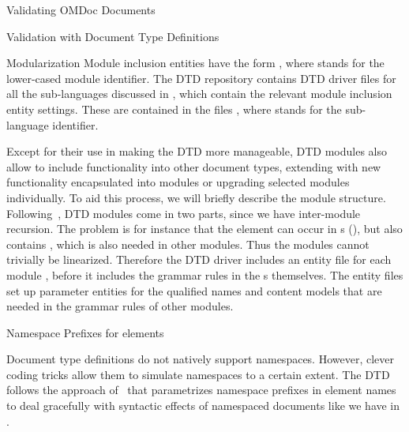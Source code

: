 \begin{tchapter}[id=validating]{Validating OMDoc Documents}
\begin{tsection}[id=validate-dtd]{Validation with Document Type Definitions}
\begin{tsubsection}[id=modularization]{Modularization}
Module inclusion entities have the form {}, where
{} stands for the lower-cased module identifier. The {\omdoc} DTD
repository contains DTD driver files for all the sub-languages discussed in
{}, which contain the relevant module inclusion entity
settings. These are contained in the files {}, where
{} stands for the sub-language identifier.

Except for their use in making the {\omdoc} DTD more manageable, DTD modules also allow to
include {\omdoc} functionality into other document types, extending {\omdoc} with new
functionality encapsulated into modules or upgrading selected {\omdoc} modules
individually. To aid this process, we will briefly describe the module structure.
Following~\cite{AltBou:mox01}, DTD modules come in two parts, since we have inter-module
recursion. The problem is for instance that the {} element can occur in
{s} ({}), but also contains {},
which is also needed in other modules. Thus the modules cannot trivially be linearized.
Therefore the DTD driver includes an entity file {} for each
module {}, before it includes the grammar rules in the
{s} {} themselves. The entity files
set up parameter entities for the qualified names and content models that are needed in
the grammar rules of other modules.
\end{tsubsection}

\begin{tsubsection}[id=namespace-magic]{Namespace Prefixes for {\omdoc} elements}
  
  Document type definitions do not natively support {\xml}
  namespaces. However, clever coding tricks allow them to simulate
  namespaces to a certain extent. The {\omdoc} DTD follows the approach
  of~\cite{AltBou:mox01} that parametrizes namespace prefixes in element names to deal
  gracefully with syntactic effects of namespaced documents like we have in {\omdoc}.
  

\end{tsubsection}
\end{tsection}
\end{tchapter}

